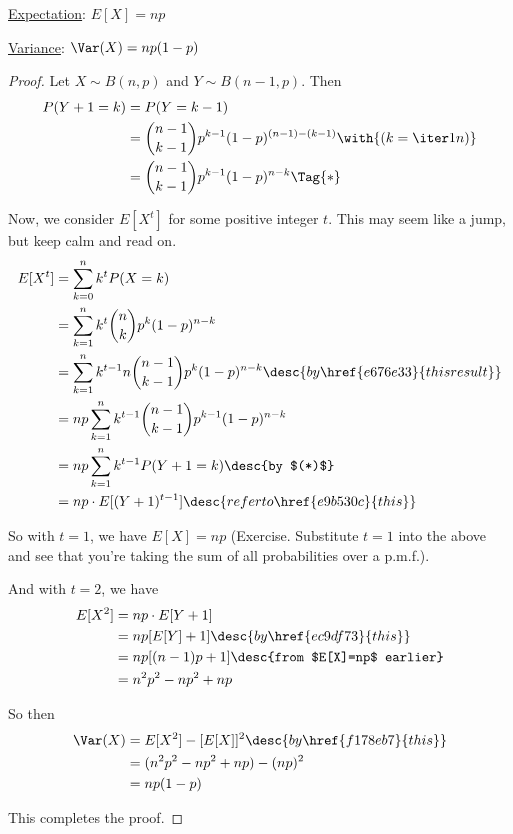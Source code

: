 \label{f9ece4b}

\begin{enumerati}
  \item\href{ecb2162}{Expectation}: $E[X]=np$
  \item\href{ddd95d5}{Variance}: $\Var(X)=np(1-p)$
\end{enumerati}

\begin{proof}
  Let $X\sim B(n,p)$ and $Y\sim B(n-1,p)$. Then
  \begin{align*}
    P(Y+1=k) &=P(Y=k-1)                                                      \\
             &=\binom {n-1}{k-1}p^{k-1}(1-p)^{(n-1)-(k-1)}\with{(k=\iter1n)} \\
             &=\binom {n-1}{k-1}p^{k-1}(1-p)^{n-k}\Tag{*}
  \end{align*}

  Now, we consider $E[X^t]$ for some positive integer $t$. This may seem like a
  jump, but keep calm and read on.
  \begin{align*}
    E[X^t] &=\sum_{k=0}^nk^tP(X=k)                                                                   \\
           &=\sum_{k=1}^nk^t\binom nkp^k(1-p)^{n-k}                                                  \\
           &=\sum_{k=1}^nk^{t-1}n\binom{n-1}{k-1}p^k(1-p)^{n-k}\desc{by \href{e676e33}{this result}} \\
           &=np\sum_{k=1}^nk^{t-1}\binom{n-1}{k-1}p^{k-1}(1-p)^{n-k}                                 \\
           &=np\sum_{k=1}^nk^{t-1}P(Y+1=k)\desc{by $(*)$}                                            \\
           &=np\cdot E[(Y+1)^{t-1}]\desc{refer to \href{e9b530c}{this}}
  \end{align*}

  So with $t=1$, we have $E[X]=np$ (Exercise. Substitute $t=1$ into the above
  and see that you're taking the sum of all probabilities over a p.m.f.).

  And with $t=2$, we have
  \begin{align*}
    E[X^2] &=np\cdot E[Y+1]                            \\
           &=np[E[Y]+1]\desc{by \href{ec9df73}{this}}  \\
           &=np[(n-1)p+1]\desc{from $E[X]=np$ earlier} \\
           &=n^2p^2-np^2+np
  \end{align*}

  So then
  \begin{align*}
    \Var(X) &=E[X^2]-[E[X]]^2\desc{by \href{f178eb7}{this}} \\
            &=(n^2p^2-np^2+np)-(np)^2                       \\
            &=np(1-p)
  \end{align*}

  This completes the proof.
\end{proof}

